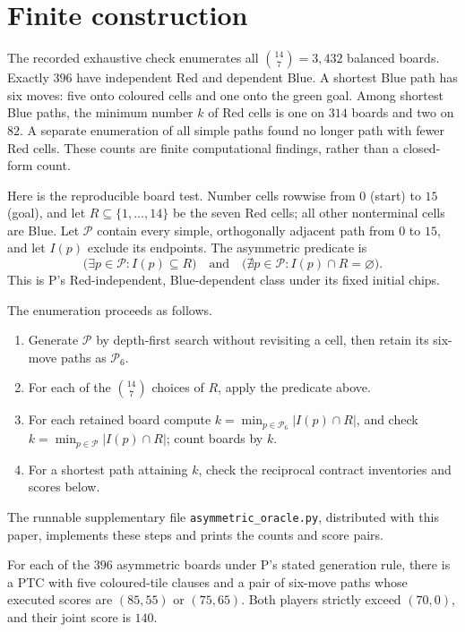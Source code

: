 \documentclass{article}
\begin{document}
\section{Finite construction}

The recorded exhaustive check enumerates all \(\binom{14}{7}=3{,}432\) balanced boards. Exactly \(396\) have
independent Red and dependent Blue. A shortest Blue path has six moves: five onto coloured cells and one onto
the green goal. Among shortest Blue paths, the minimum number \(k\) of Red cells is one on \(314\) boards and
two on \(82\). A separate enumeration of all simple paths found no longer path with fewer Red cells. These
counts are finite computational findings, rather than a closed-form count. %

Here is the reproducible board test. Number cells rowwise from \(0\) (start) to \(15\) (goal), and let
\(R\subseteq\{1,\ldots,14\}\) be the seven Red cells; all other nonterminal cells are Blue. Let \(\mathcal P\)
contain every simple, orthogonally adjacent path from \(0\) to \(15\), and let \(I(p)\) exclude its endpoints.
The asymmetric predicate is
\[
 \bigl(\exists p\in\mathcal P: I(p)\subseteq R\bigr)
 \quad\text{and}\quad
 \bigl(\nexists p\in\mathcal P: I(p)\cap R=\varnothing\bigr).
\]
This is P's Red-independent, Blue-dependent class under its fixed initial chips. %

The enumeration proceeds as follows. %
\begin{enumerate}
\item Generate \(\mathcal P\) by depth-first search without revisiting a cell, then retain its six-move paths as \(\mathcal P_6\).
\item For each of the \(\binom{14}{7}\) choices of \(R\), apply the predicate above.
\item For each retained board compute \(k=\min_{p\in\mathcal P_6}|I(p)\cap R|\), and check
\(k=\min_{p\in\mathcal P}|I(p)\cap R|\); count boards by \(k\).
\item For a shortest path attaining \(k\), check the reciprocal contract inventories and scores below.
\end{enumerate}
The runnable supplementary file \texttt{asymmetric\_oracle.py}, distributed with this paper, implements these
steps and prints the counts and score pairs. %

\begin{proposition}
For each of the \(396\) asymmetric boards under P's stated generation rule, there is a PTC with five
coloured-tile clauses and a pair of six-move paths whose executed scores are \((85,55)\) or \((75,65)\). Both
players strictly exceed \((70,0)\), and their joint score is \(140\). %
\end{proposition}
\end{document}
